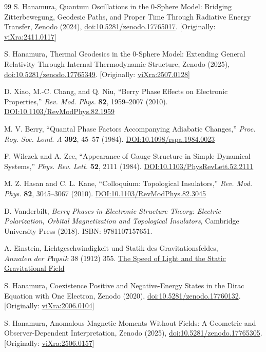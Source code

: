 \documentclass[%
 reprint,
 amsmath,amssymb,
 aps,
]{revtex4-1}
\numberwithin{equation}{section}%
\begin{document}
\begin{thebibliography}{99}
S. Hanamura, Quantum Oscillations in the 0-Sphere Model: Bridging Zitterbewegung, Geodesic Paths, and Proper Time Through Radiative Energy Transfer, Zenodo (2024), \href{https://doi.org/10.5281/zenodo.17765017}{doi:10.5281/zenodo.17765017}. [Originally: \href{https://vixra.org/abs/2411.0117}{viXra:2411.0117}]

S. Hanamura, Thermal Geodesics in the 0-Sphere Model: Extending General Relativity Through Internal Thermodynamic Structure, Zenodo (2025), \href{https://doi.org/10.5281/zenodo.17765349}{doi:10.5281/zenodo.17765349}. [Originally: \href{https://vixra.org/abs/2507.0128}{viXra:2507.0128}]

D. Xiao, M.-C. Chang, and Q. Niu, ``Berry Phase Effects on Electronic Properties,'' \textit{Rev. Mod. Phys.} \textbf{82}, 1959–2007 (2010). \href{https://doi.org/10.1103/RevModPhys.82.1959}{DOI:10.1103/RevModPhys.82.1959}

M. V. Berry, ``Quantal Phase Factors Accompanying Adiabatic Changes,'' \textit{Proc. Roy. Soc. Lond. A} \textbf{392}, 45–57 (1984). \href{https://doi.org/10.1098/rspa.1984.0023}{DOI:10.1098/rspa.1984.0023}

F. Wilczek and A. Zee, ``Appearance of Gauge Structure in Simple Dynamical Systems,'' \textit{Phys. Rev. Lett.} \textbf{52}, 2111 (1984). \href{https://doi.org/10.1103/PhysRevLett.52.2111}{DOI:10.1103/PhysRevLett.52.2111}

M. Z. Hasan and C. L. Kane, ``Colloquium: Topological Insulators,'' \textit{Rev. Mod. Phys.} \textbf{82}, 3045–3067 (2010). \href{https://doi.org/10.1103/RevModPhys.82.3045}{DOI:10.1103/RevModPhys.82.3045}

D. Vanderbilt, \textit{Berry Phases in Electronic Structure Theory: Electric Polarization, Orbital Magnetization and Topological Insulators}, Cambridge University Press (2018). ISBN: 9781107157651.

A. Einstein, Lichtgeschwindigkeit und Statik des Gravitationsfeldes, $\textit{Annalen der Physik}$ 38 (1912) 355. \href{http://myweb.rz.uni-augsburg.de/~eckern/adp/history/einstein-papers/1912_38_355-369.pdf}{The Speed of Light and the Static Gravitational Field}

S. Hanamura, Coexistence Positive and Negative-Energy States in the Dirac Equation with One Electron, Zenodo (2020), \href{https://doi.org/10.5281/zenodo.17760132}{doi:10.5281/zenodo.17760132}. [Originally: \href{https://vixra.org/abs/2006.0104}{viXra:2006.0104}]

S. Hanamura, Anomalous Magnetic Moments Without Fields: A Geometric and Observer-Dependent Interpretation, Zenodo (2025), \href{https://doi.org/10.5281/zenodo.17765305}{doi:10.5281/zenodo.17765305}. [Originally: \href{https://vixra.org/abs/2506.0157}{viXra:2506.0157}]

\end{thebibliography}
\end{document}
